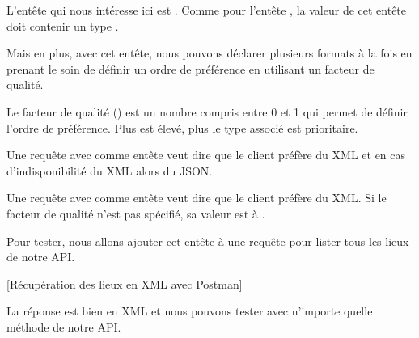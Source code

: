 \documentclass[big]{zmdocument}
\begin{document}
L'entête qui nous intéresse ici est . Comme pour l'entête , la valeur de cet entête doit contenir un type .



Mais en plus, avec cet entête, nous pouvons déclarer plusieurs formats à la fois en prenant le soin de définir un ordre de préférence en utilisant un facteur de qualité.



\begin{Information}
Le facteur de qualité () est un nombre compris entre 0 et 1 qui permet de définir l'ordre de préférence. Plus  est élevé, plus le type  associé est prioritaire.
\end{Information}


Une requête avec comme entête  veut dire que le client préfère du XML et en cas d'indisponibilité du XML alors du JSON.



Une requête avec comme entête  veut dire que le client préfère du XML. Si le facteur de qualité n'est pas spécifié, sa valeur est à .



Pour tester, nous allons ajouter cet entête à une requête pour lister tous les lieux de notre API.



[Récupération des lieux en XML avec Postman]


La réponse est bien en XML et nous pouvons tester avec n'importe quelle méthode de notre API.
\end{document}
